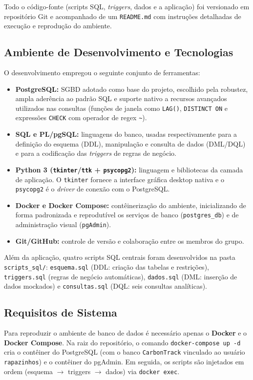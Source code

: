 \documentclass[12pt]{article}
\begin{document}
Todo o código-fonte (scripts SQL, \textit{triggers}, dados e a aplicação) foi versionado em repositório Git e acompanhado de um \texttt{README.md} com instruções detalhadas de execução e reprodução do ambiente.

\subsection{Ambiente de Desenvolvimento e Tecnologias}
O desenvolvimento empregou o seguinte conjunto de ferramentas:

\begin{itemize}
    \item \textbf{PostgreSQL:} SGBD adotado como base do projeto, escolhido pela robustez, ampla aderência ao padrão SQL e suporte nativo a recursos avançados utilizados nas consultas (funções de janela como \texttt{LAG()}, \texttt{DISTINCT ON} e expressões \texttt{CHECK} com operador de regex \texttt{\textasciitilde}).
    \item \textbf{SQL e PL/pgSQL:} linguagens do banco, usadas respectivamente para a definição do esquema (DDL), manipulação e consulta de dados (DML/DQL) e para a codificação das \textit{triggers} de regras de negócio.
    \item \textbf{Python 3 (\texttt{tkinter}/\texttt{ttk} + \texttt{psycopg2}):} linguagem e bibliotecas da camada de aplicação. O \texttt{tkinter} fornece a interface gráfica desktop nativa e o \texttt{psycopg2} é o \textit{driver} de conexão com o PostgreSQL.
    \item \textbf{Docker e Docker Compose:} contêinerização do ambiente, inicializando de forma padronizada e reprodutível os serviços de banco (\texttt{postgres\_db}) e de administração visual (\texttt{pgAdmin}).
    \item \textbf{Git/GitHub:} controle de versão e colaboração entre os membros do grupo.
\end{itemize}

Além da aplicação, quatro scripts SQL centrais foram desenvolvidos na pasta \texttt{scripts\_sql/}: \texttt{esquema.sql} (DDL: criação das tabelas e restrições), \texttt{triggers.sql} (regras de negócio automáticas), \texttt{dados.sql} (DML: inserção de dados mockados) e \texttt{consultas.sql} (DQL: seis consultas analíticas).

\subsection{Requisitos de Sistema}
Para reproduzir o ambiente de banco de dados é necessário apenas o \textbf{Docker} e o \textbf{Docker Compose}. Na raiz do repositório, o comando \texttt{docker-compose up -d} cria o contêiner do PostgreSQL (com o banco \texttt{CarbonTrack} vinculado ao usuário \texttt{rapazinhos}) e o contêiner do pgAdmin. Em seguida, os scripts são injetados em ordem (esquema $\rightarrow$ triggers $\rightarrow$ dados) via \texttt{docker exec}.
\end{document}
